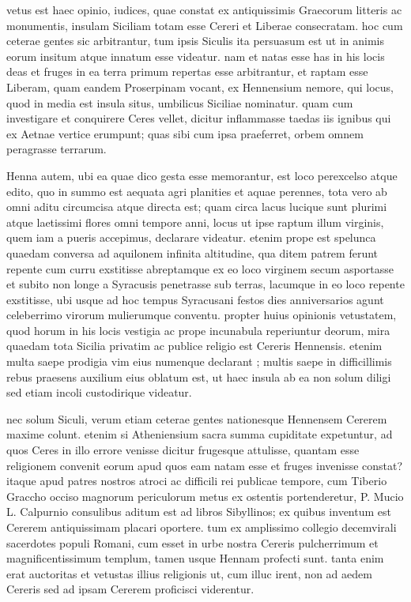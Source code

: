  vetus est haec opinio, iudices, quae constat ex antiquissimis Graecorum litteris ac monumentis, insulam Siciliam totam esse Cereri et Liberae consecratam. hoc cum ceterae gentes sic arbitrantur, tum ipsis Siculis ita persuasum est ut in animis eorum insitum atque innatum esse videatur. nam et natas esse has in his locis deas et fruges in ea terra primum repertas esse arbitrantur, et raptam esse Liberam, quam eandem Proserpinam vocant, ex Hennensium nemore, qui locus, quod in media est insula situs, umbilicus Siciliae nominatur. quam cum investigare et conquirere Ceres vellet, dicitur inflammasse taedas iis ignibus qui ex Aetnae vertice erumpunt; quas sibi cum ipsa praeferret, orbem omnem peragrasse terrarum.

 Henna autem, ubi ea quae dico gesta esse memorantur, est loco perexcelso atque edito, quo in summo est aequata agri planities et aquae perennes, tota vero ab omni aditu circumcisa atque directa est; quam circa lacus lucique sunt plurimi atque laetissimi flores omni tempore anni, locus ut ipse raptum illum virginis, quem iam a pueris accepimus, declarare videatur. etenim prope est spelunca quaedam conversa ad aquilonem infinita altitudine, qua ditem patrem ferunt repente cum curru exstitisse abreptamque ex eo loco virginem secum asportasse et subito non longe a Syracusis penetrasse sub terras, lacumque in eo loco repente exstitisse, ubi usque ad hoc tempus Syracusani festos dies anniversarios agunt celeberrimo virorum mulierumque conventu. propter huius opinionis vetustatem, quod horum in his locis vestigia ac prope incunabula reperiuntur deorum, mira quaedam tota Sicilia privatim ac publice religio est Cereris Hennensis. etenim multa saepe prodigia vim eius numenque declarant ; multis saepe in difficillimis rebus praesens auxilium eius oblatum est, ut haec insula ab ea non solum diligi sed etiam incoli custodirique videatur.

 nec solum Siculi, verum etiam ceterae gentes nationesque Hennensem Cererem maxime colunt. etenim si Atheniensium sacra summa cupiditate expetuntur, ad quos Ceres in illo errore venisse dicitur frugesque attulisse, quantam esse religionem convenit eorum apud quos eam natam esse et fruges invenisse constat? itaque apud patres nostros atroci ac difficili rei publicae tempore, cum Tiberio Graccho occiso magnorum periculorum metus ex ostentis portenderetur, P. Mucio L. Calpurnio consulibus aditum est ad libros Sibyllinos; ex quibus inventum est Cererem antiquissimam placari oportere. tum ex amplissimo collegio decemvirali sacerdotes populi Romani, cum esset in urbe nostra Cereris pulcherrimum et magnificentissimum templum, tamen usque Hennam profecti sunt. tanta enim erat auctoritas et vetustas illius religionis ut, cum illuc irent, non ad aedem Cereris sed ad ipsam Cererem proficisci viderentur.

